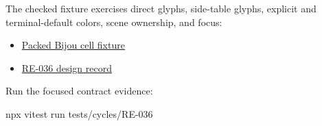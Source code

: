 The checked fixture exercises direct glyphs, side-table glyphs, explicit and terminal-default colors, scene ownership, and focus:

\begin{itemize}
\tightlist
\item
  \href{https://github.com/flyingrobots/bijou/blob/cbd70612140e7a450d764b3c7be1c6af878b99bc/tests/fixtures/RE-036/packed-bijou-cells.v1.json}{Packed Bijou cell fixture}
\item
  \href{https://github.com/flyingrobots/bijou/blob/cbd70612140e7a450d764b3c7be1c6af878b99bc/docs/design/RE-036-packed-bijou-cells-surface-adapter.md}{RE-036 design record}
\end{itemize}

Run the focused contract evidence:

\begin{CodeBlock}
npx vitest run tests/cycles/RE-036
\end{CodeBlock}

